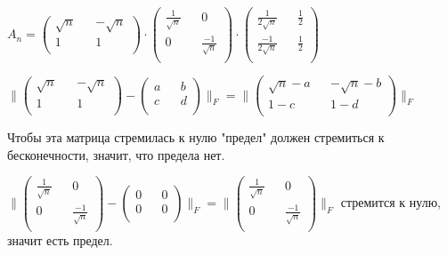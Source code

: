 \documentclass[a4paper, 11pt]{article}
\begin{document}
\begin{enumerate}
\begin{enumerate}
			$A_n = \begin{pmatrix}
				\sqrt{n} && -\sqrt{n} \\
				1 && 1 \\
			\end{pmatrix} \cdot \begin{pmatrix}
			\frac{1}{\sqrt{n}} && 0 \\
			0 && \frac{-1}{\sqrt{n}} \\
		\end{pmatrix} \cdot \begin{pmatrix}
		\frac{1}{2\sqrt{n}} && \frac{1}{2} \\
		\frac{-1}{2\sqrt{n}} && \frac{1}{2} \\
		\end{pmatrix}$
	
			$\|\begin{pmatrix}
				\sqrt{n} && -\sqrt{n} \\
				1 && 1 \\
			\end{pmatrix} - \begin{pmatrix}
			a && b \\
			c && d \\
		\end{pmatrix}\|_{F} = \|\begin{pmatrix}
		\sqrt{n} - a && -\sqrt{n} - b \\
		1 - c && 1 - d\\
	\end{pmatrix}\|_F$

		Чтобы эта матрица стремилась к нулю "предел" должен стремиться к бесконечности, значит, что предела нет.
		
		$ \| \begin{pmatrix}
			\frac{1}{\sqrt{n}} && 0 \\
			0 && \frac{-1}{\sqrt{n}} \\
		\end{pmatrix} - \begin{pmatrix}
		0 && 0 \\
		0 && 0 \\
	\end{pmatrix}\|_F = \| \begin{pmatrix}
		\frac{1}{\sqrt{n}} && 0 \\
		0 && \frac{-1}{\sqrt{n}} \\
	\end{pmatrix}\|_F$ стремится к нулю, значит есть предел.


\end{enumerate}
\end{enumerate}
\end{document}
